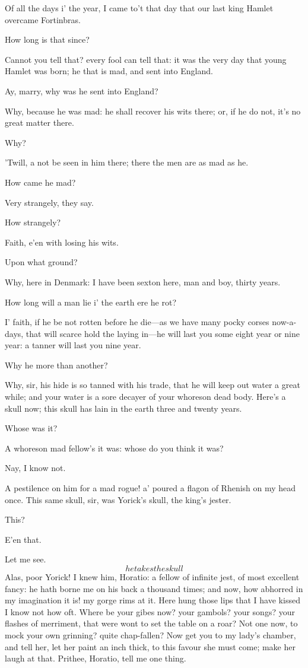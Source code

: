 \documentclass[11pt]{book}
\begin{document}
	Of all the days i' the year, I came to't that day
	that our last king Hamlet overcame Fortinbras.

\1	How long is that since?

	Cannot you tell that? every fool can tell that: it
	was the very day that young Hamlet was born; he that
	is mad, and sent into England.

\1	Ay, marry, why was he sent into England?

	Why, because he was mad: he shall recover his wits
	there; or, if he do not, it's no great matter there.

\1	Why?

	'Twill, a not be seen in him there; there the men
	are as mad as he.

\1	How came he mad?

	Very strangely, they say.

\1	How strangely?

	Faith, e'en with losing his wits.

\1	Upon what ground?

	Why, here in Denmark: I have been sexton here, man
	and boy, thirty years.

\1	How long will a man lie i' the earth ere he rot?

	I' faith, if he be not rotten before he die---as we
	have many pocky corses now-a-days, that will scarce
	hold the laying in---he will last you some eight year
	or nine year: a tanner will last you nine year.

\1	Why he more than another?

	Why, sir, his hide is so tanned with his trade, that
	he will keep out water a great while; and your water
	is a sore decayer of your whoreson dead body.
	Here's a skull now; this skull has lain in the earth
	three and twenty years.

\1	Whose was it?

	A whoreson mad fellow's it was: whose do you think it was?

\1	Nay, I know not.

	A pestilence on him for a mad rogue! a' poured a
	flagon of Rhenish on my head once. This same skull,
	sir, was Yorick's skull, the king's jester.

\1	This?

	E'en that.

\1	\DriveOut* Let me see. \[he takes the skull\]
	Alas, poor Yorick! I knew him, Horatio: a fellow
	of infinite jest, of most excellent fancy: he hath
	borne me on his back a thousand times; and now, how
	abhorred in my imagination it is! my gorge rims at
	it. Here hung those lips that I have kissed I know
	not how oft. Where be your gibes now? your
	gambols? your songs? your flashes of merriment,
	that were wont to set the table on a roar? Not one
	now, to mock your own grinning? quite chap-fallen?
	Now get you to my lady's chamber, and tell her, let
	her paint an inch thick, to this favour she must
	come; make her laugh at that. Prithee, Horatio, tell
	me one thing.
\end{document}
